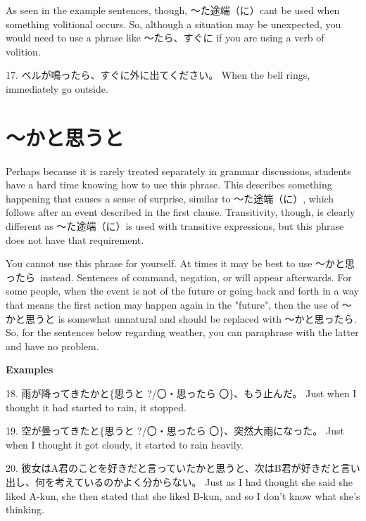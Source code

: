 \par{ As seen in the example sentences, though, ～た途端（に）can\textquotesingle t be used when something volitional occurs. So, although a situation may be unexpected, you would need to use a phrase like ～たら、すぐに if you are using a verb of volition. }

\par{17. ベルが鳴ったら、すぐに外に出てください。 \hfill\break
When the bell rings, immediately go outside. }
      
\section{～かと思うと}
 
\par{ Perhaps because it is rarely treated separately in grammar discussions, students have a hard time knowing how to use this phrase. This describes something happening that causes a sense of surprise, similar to ～た途端（に）, which follows after an event described in the first clause. Transitivity, though, is clearly different as ～た途端（に）is used with transitive expressions, but this phrase does not have that requirement. }

\par{ You cannot use this phrase for yourself. At times it may be best to use ～かと思ったら instead. Sentences of command, negation, or will appear afterwards. For some people, when the event is not of the future or going back and forth in a way that means the first action may happen again in the "future", then the use of ～かと思うと is somewhat unnatural and should be replaced with ～かと思ったら. So, for the sentences below regarding weather, you can paraphrase with the latter and have no problem. }

\begin{center}
 \textbf{Examples }
\end{center}

\par{18. 雨が降ってきたかと\{思うと ?\slash 〇・思ったら 〇\}、もう止んだ。 \hfill\break
Just when I thought it had started to rain, it stopped. }

\par{19. 空が曇ってきたと\{思うと ?\slash 〇・思ったら 〇\}、突然大雨になった。 \hfill\break
Just when I thought it got cloudy, it started to rain heavily. }

\par{20. 彼女はA君のことを好きだと言っていたかと思うと、次はB君が好きだと言い出し、何を考えているのかよく分からない。 \hfill\break
Just as I had thought she said she liked A-kun, she then stated that she liked B-kun, and so I don't know what she's thinking. }


